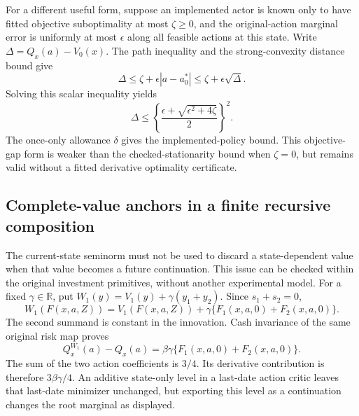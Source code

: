 For a different useful form, suppose an
implemented actor is known only to have
fitted objective suboptimality at most
\(\zeta\geq0\), and the original-action
marginal error is uniformly at most
\(\epsilon\) along all feasible actions at
this state.  Write
\(\Delta=Q_x(a)-V_0(x)\).
The path inequality and the strong-convexity
distance bound give
\[
 \Delta\leq \zeta+\epsilon|a-a_0^*|
                 \leq\zeta+\epsilon\sqrt{\Delta}.
\]
Solving this scalar inequality yields
\begin{equation}\label{eq:approxactor121}
 \Delta\leq
  \left\{\frac{\epsilon+
                     \sqrt{\epsilon^2+4\zeta}}2\right\}^{\!2}.
\end{equation}
The once-only allowance \(\delta\) gives the
implemented-policy bound.
This objective-gap form is weaker than the
checked-stationarity bound when \(\zeta=0\),
but remains valid without a fitted derivative
optimality certificate.

\subsection{Complete-value anchors in a finite recursive composition}

The current-state seminorm must not be used to discard a
state-dependent value when that value becomes a future
continuation.  This issue can be checked within the
original investment primitives, without another
experimental model.  For a fixed \(\gamma\in\mathbb R\),
put \(W_1(y)=V_1(y)+\gamma(y_1+y_2)\).
Since \(s_1+s_2=0\),
\[
 W_1(F(x,a,Z))
 =V_1(F(x,a,Z))
       +\gamma\{F_1(x,a,0)+F_2(x,a,0)\}.
\]
The second summand is constant in the innovation.
Cash invariance of the same original risk map proves
\[
 Q_x^{W_1}(a)-Q_x(a)
   =\beta\gamma\{F_1(x,a,0)+F_2(x,a,0)\}.
\]
The sum of the two action coefficients is \(3/4\).
Its derivative contribution is therefore
\(3\beta\gamma/4\).
An additive state-only level in a last-date action
critic leaves that last-date minimizer unchanged,
but exporting this level as a continuation changes
the root marginal as displayed.

